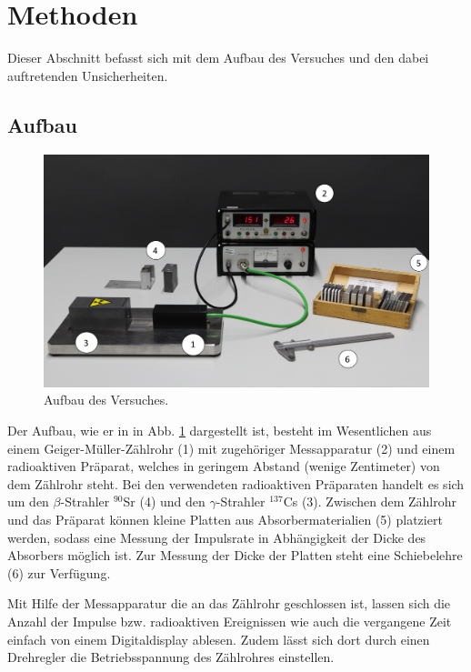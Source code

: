 \section{Methoden}
	
	Dieser Abschnitt befasst sich mit dem Aufbau des Versuches und den dabei auftretenden Unsicherheiten.
	
	\subsection{Aufbau}	
		
		\begin{figure}[ht]
			\centering
			\includegraphics[width=\textwidth]{Aufbau.png}
			\caption{Aufbau des Versuches.\cite{WWU}}
			\label{fig:Aufbau}	
		\end{figure}
		Der Aufbau, wie er in in Abb. \ref{fig:Aufbau} dargestellt ist, besteht im Wesentlichen aus einem Geiger-Müller-Zählrohr (1) mit zugehöriger Messapparatur (2) und einem radioaktiven Präparat, welches in geringem Abstand (wenige Zentimeter) von dem Zählrohr steht.
		Bei den verwendeten radioaktiven Präparaten handelt es sich um den $\beta$-Strahler $^{90}$Sr (4) und den $\gamma$-Strahler $^{137}$Cs (3).
		Zwischen dem Zählrohr und das Präparat können kleine Platten aus Absorbermaterialien (5) platziert werden, sodass eine Messung der Impulsrate in Abhängigkeit der Dicke des Absorbers möglich ist.
		Zur Messung der Dicke der Platten steht eine Schiebelehre (6) zur Verfügung.
		
		Mit Hilfe der Messapparatur die an das Zählrohr geschlossen ist, lassen sich die Anzahl der Impulse bzw. radioaktiven Ereignissen wie auch die vergangene Zeit einfach von einem Digitaldisplay ablesen.
		Zudem lässt sich dort durch einen Drehregler die Betriebsspannung des Zählrohres einstellen.
		
